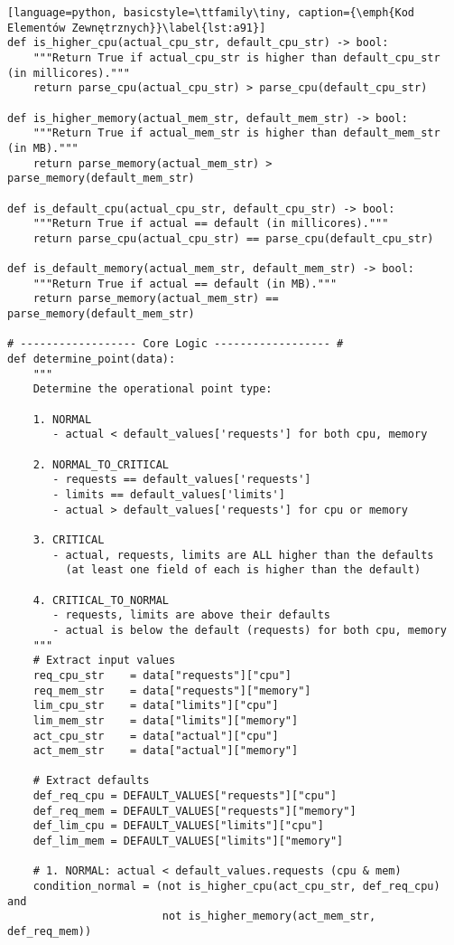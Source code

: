 \begin{lstlisting}[language=python, basicstyle=\ttfamily\tiny, caption={\emph{Kod Elementów Zewnętrznych}}\label{lst:a91}]
def is_higher_cpu(actual_cpu_str, default_cpu_str) -> bool:
    """Return True if actual_cpu_str is higher than default_cpu_str (in millicores)."""
    return parse_cpu(actual_cpu_str) > parse_cpu(default_cpu_str)

def is_higher_memory(actual_mem_str, default_mem_str) -> bool:
    """Return True if actual_mem_str is higher than default_mem_str (in MB)."""
    return parse_memory(actual_mem_str) > parse_memory(default_mem_str)

def is_default_cpu(actual_cpu_str, default_cpu_str) -> bool:
    """Return True if actual == default (in millicores)."""
    return parse_cpu(actual_cpu_str) == parse_cpu(default_cpu_str)

def is_default_memory(actual_mem_str, default_mem_str) -> bool:
    """Return True if actual == default (in MB)."""
    return parse_memory(actual_mem_str) == parse_memory(default_mem_str)

# ------------------ Core Logic ------------------ #
def determine_point(data):
    """
    Determine the operational point type:
    
    1. NORMAL
       - actual < default_values['requests'] for both cpu, memory

    2. NORMAL_TO_CRITICAL
       - requests == default_values['requests']
       - limits == default_values['limits']
       - actual > default_values['requests'] for cpu or memory

    3. CRITICAL
       - actual, requests, limits are ALL higher than the defaults
         (at least one field of each is higher than the default)

    4. CRITICAL_TO_NORMAL
       - requests, limits are above their defaults
       - actual is below the default (requests) for both cpu, memory
    """
    # Extract input values
    req_cpu_str    = data["requests"]["cpu"]
    req_mem_str    = data["requests"]["memory"]
    lim_cpu_str    = data["limits"]["cpu"]
    lim_mem_str    = data["limits"]["memory"]
    act_cpu_str    = data["actual"]["cpu"]
    act_mem_str    = data["actual"]["memory"]

    # Extract defaults
    def_req_cpu = DEFAULT_VALUES["requests"]["cpu"]
    def_req_mem = DEFAULT_VALUES["requests"]["memory"]
    def_lim_cpu = DEFAULT_VALUES["limits"]["cpu"]
    def_lim_mem = DEFAULT_VALUES["limits"]["memory"]

    # 1. NORMAL: actual < default_values.requests (cpu & mem)
    condition_normal = (not is_higher_cpu(act_cpu_str, def_req_cpu) and
                        not is_higher_memory(act_mem_str, def_req_mem))


\end{lstlisting}

